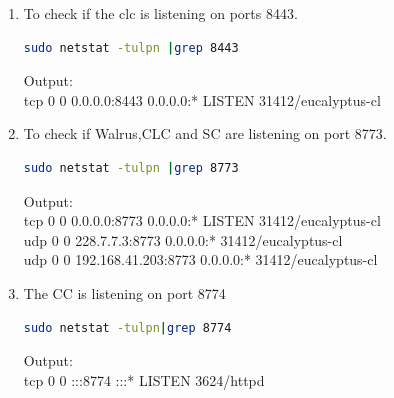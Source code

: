 \begin{enumerate}
\item To check if the clc is listening on ports 8443.
\begin{lstlisting}[language=bash]
sudo netstat -tulpn |grep 8443
\end{lstlisting}
Output: \\
tcp \hspace{6mm} 0 \hspace{6mm}     0 0.0.0.0:8443 \hspace{6mm}   0.0.0.0:* \hspace{6mm} LISTEN 31412/eucalyptus-cl 
\item To check if Walrus,CLC and SC are listening on port 8773.
\begin{lstlisting}[language=bash]
sudo netstat -tulpn |grep 8773
\end{lstlisting}
Output:\\
tcp   \hspace{6mm}     0 \hspace{6mm}     0 0.0.0.0:8773 \hspace{6mm}               0.0.0.0:*                  \hspace{6mm} LISTEN   \hspace{6mm}   31412/eucalyptus-cl  \\
udp    \hspace{6mm}    0  \hspace{6mm}    0 228.7.7.3:8773  \hspace{6mm}            0.0.0.0:*                              \hspace{6mm} 31412/eucalyptus-cl \\
udp    \hspace{6mm}    0  \hspace{6mm}    0 192.168.41.203:8773 \hspace{6mm}        0.0.0.0:*                              \hspace{6mm} 31412/eucalyptus-cl
\item The CC is listening on port 8774
\begin{lstlisting}[language=bash]
sudo netstat -tulpn|grep 8774
\end{lstlisting}
Output:\\
tcp   \hspace{6mm}      0  \hspace{6mm}     0 :::8774       \hspace{6mm}               :::*                       \hspace{6mm}  LISTEN      3624/httpd 

\end{enumerate}
